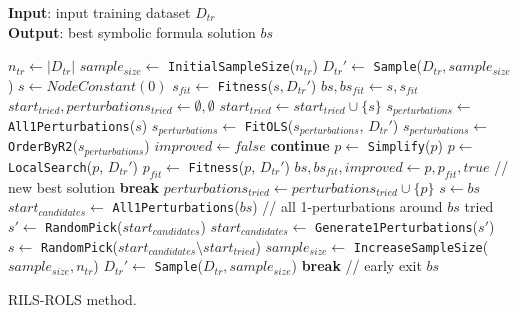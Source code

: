 \documentclass[a4paper,12pt]{elsarticle}
\begin{document}
    \begin{algorithm}
    \small
    \hspace*{\algorithmicindent} \textbf{Input}: input training dataset $D_{tr}$ \\
    \hspace*{\algorithmicindent} \textbf{Output}: best symbolic formula solution $bs$
   	\begin{algorithmic}[1] 
   		\State $n_{tr} \gets |D_{tr}|$
   		\State $sample_{size} \gets $ \texttt{InitialSampleSize}($n_{tr}$)
   		\State $D_{tr}' \gets$ \texttt{Sample}($D_{tr}, sample_{size}$)
   		\State $s \gets NodeConstant(0)$ 
   		\State $s_{fit} \gets$ \texttt{Fitness}($s, D_{tr}'$)
   		\State $bs, bs_{fit} \gets s, s_{fit}$ \label{line:solSet}
   		\State $start_{tried}, perturbations_{tried} \gets \emptyset, \emptyset$
   			\State $start_{tried} \gets start_{tried} \cup \{s\}$
   			\State $s_{perturbations} \gets $ \texttt{All1Perturbations}($s$) \label{line:sPert}
   			\State $s_{perturbations} \gets $ \texttt{FitOLS}($s_{perturbations}$, $D_{tr}'$)
   			\State $s_{perturbations} \gets $ \texttt{OrderByR2}($s_{perturbations}$) \label{line:orderR2}
   			\State $improved \gets false $
   					\State \textbf{continue}
   				\EndIf
  				\State $p \gets $ \texttt{Simplify}($p$) \label{line:simp}
  				\State $p \gets $ \texttt{LocalSearch}($p$, $D_{tr}'$) \label{line:ls}
  				\State $p_{fit} \gets$ \texttt{Fitness}($p$, $D_{tr}'$)
  				 \label{line:avoid1}
  					\State $bs, bs_{fit}, improved \gets p, p_{fit}, true$ // new best solution
  					\State \textbf{break}
  				\EndIf \label{line:avoid2}
  				\State $perturbations_{tried} \gets perturbations_{tried} \cup \{p\}$
   			\EndFor
   				\State $s \gets bs$ \label{line:improved}
   			\Else
   				\State $start_{candidates} \gets $ \texttt{All1Perturbations}($bs$)
   				 // all 1-perturbations around $bs$ tried
   					\State $s' \gets $ \texttt{RandomPick}($start_{candidates}$)  \label{line:pert21}
   					\State $start_{candidates} \gets $ \texttt{Generate1Perturbations}($s'$) \label{line:pert22}
   				\EndIf
   				\State $s \gets $ \texttt{RandomPick}($start_{candidates} \setminus start_{tried}$) \label{line:randPick}
   					\State $sample_{size} \gets$ \texttt{IncreaseSampleSize}($sample_{size}, n_{tr}$) \label{line:sampleAdj1}
   					\State $D_{tr}' \gets$ \texttt{Sample}($D_{tr}, sample_{size}$)\label{line:sampleAdj2}
   				\EndIf
   			\EndIf
   				\State \textbf{break} // early exit
   			\EndIf
   		\EndWhile
   		\State \Return $bs$
   		\EndProcedure
   	\end{algorithmic}
   	\caption{RILS-ROLS method.}
   	\label{alg:rilsrols}
   \end{algorithm}  
\end{document}
